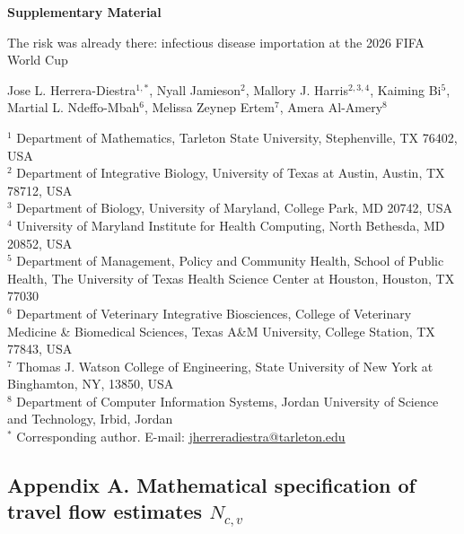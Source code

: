 \documentclass[12pt, a4paper]{article}
\newcounter{suppfig}
\begin{document}
\begin{center}
{\Large\bfseries Supplementary Material}

\vspace{0.5cm}

{\large The risk was already there: infectious disease
importation at the 2026 FIFA World Cup}

\vspace{0.5cm}

Jose L. Herrera-Diestra$^{1,*}$, Nyall Jamieson$^{2}$, Mallory J. Harris$^{2,3,4}$, Kaiming Bi$^{5}$, Martial L. Ndeffo-Mbah$^{6}$,  Melissa Zeynep Ertem$^{7}$, Amera Al-Amery$^{8}$

\vspace{0.3cm}

{\small
$^{1}$ Department of Mathematics, Tarleton State University, Stephenville, TX 76402, USA\\
$^{2}$ Department of Integrative Biology, University of Texas at Austin, Austin, TX 78712, USA\\
$^{3}$ Department of Biology, University of Maryland, College Park, MD 20742, USA\\
$^{4}$ University of Maryland Institute for Health Computing, North Bethesda, MD 20852, USA\\
$^{5}$ Department of Management, Policy and Community Health, School of Public Health, The University of Texas Health Science Center at Houston, Houston, TX 77030\\
$^{6}$ Department of Veterinary Integrative Biosciences, College of Veterinary Medicine \& Biomedical Sciences, Texas A\&M University, College Station, TX 77843, USA\\
$^{7}$ Thomas J. Watson College of Engineering, State University of New York at Binghamton, NY, 13850, USA\\
$^{8}$ Department of Computer Information Systems, Jordan University of Science and Technology, Irbid, Jordan\\
$^{*}$ Corresponding author.
E-mail: \href{mailto:jherreradiestra@tarleton.edu}{jherreradiestra@tarleton.edu}
}
\end{center}

\vspace{0.5cm}

\setcounter{suppfig}{0}

\subsection*{Appendix A. Mathematical specification of travel flow
estimates $N_{c,v}$}
\end{document}
